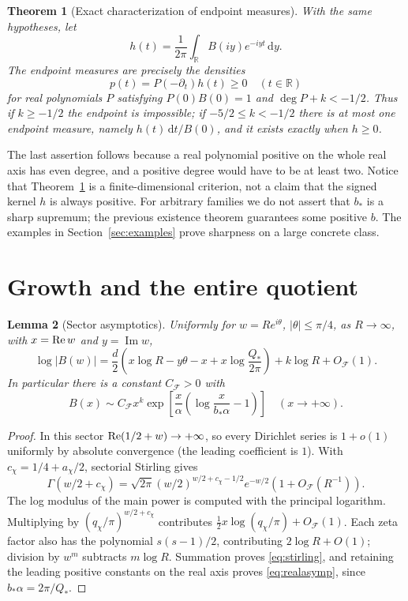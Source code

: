 \documentclass[11pt]{article}
\newtheorem{theorem}{Theorem}[section]
\newtheorem{lemma}[theorem]{Lemma}
\theoremstyle{remark}\newtheorem{remark}[theorem]{Remark}
\newcommand{\R}{\mathbb R}\newcommand{\C}{\mathbb C}
\newcommand{\F}{\mathcal F}\newcommand{\dd}{\,\mathrm d}
\newcommand{\Ima}{\operatorname{Im}}\newcommand{\sinc}{\operatorname{sinc}}
\begin{document}
\begin{theorem}[Exact characterization of endpoint measures]\label{thm:class}
With the same hypotheses, let
\[
 h(t)=\frac1{2\pi}\int_{\R}B(iy)e^{-iyt}\dd y.
\]
The endpoint measures are precisely the densities
\begin{equation}\label{eq:density}
 p(t)=P(-\partial_t)h(t)\ge0\quad(t\in\R)
\end{equation}
for real polynomials $P$ satisfying $P(0)B(0)=1$ and $\deg P+k<-1/2$. Thus if $k\ge-1/2$ the endpoint is impossible; if $-5/2\le k<-1/2$ there is at most one endpoint measure, namely $h(t)\dd t/B(0)$, and it exists exactly when $h\ge0$.
\end{theorem}

The last assertion follows because a real polynomial positive on the whole real axis has even degree, and a positive degree would have to be at least two. Notice that Theorem~\ref{thm:class} is a finite-dimensional criterion, not a claim that the signed kernel $h$ is always positive. For arbitrary families we do not assert that $b_*$ is a sharp supremum; the previous existence theorem guarantees some positive $b$. The examples in Section~\ref{sec:examples} prove sharpness on a large concrete class.

\section{Growth and the entire quotient}
\begin{lemma}[Sector asymptotics]\label{lem:stirling}
Uniformly for $w=R e^{i\theta}$, $|\theta|\le\pi/4$, as $R\to\infty$, with $x=\operatorname{Re} w$ and $y=\Ima w$,
\begin{equation}\label{eq:stirling}
 \log|B(w)|=\frac d2\left(x\log R-y\theta-x+x\log\frac{Q_*}{2\pi}\right)+k\log R+O_\F(1).
\end{equation}
In particular there is a constant $C_\F>0$ with
\begin{equation}\label{eq:realasymp}
 B(x)\sim C_\F x^k\exp\left[\frac x\alpha\left(\log\frac{x}{b_*\alpha}-1\right)\right]
 \quad(x\to+\infty).
\end{equation}
\end{lemma}
\begin{proof}
In this sector $\operatorname{Re}(1/2+w)\to+\infty$, so every Dirichlet series is $1+o(1)$ uniformly by absolute convergence (the leading coefficient is $1$). With $c_\chi=1/4+a_\chi/2$, sectorial Stirling gives
\[
 \Gamma(w/2+c_\chi)=\sqrt{2\pi}(w/2)^{w/2+c_\chi-1/2}e^{-w/2}(1+O_\F(R^{-1})).
\]
The log modulus of the main power is computed with the principal logarithm. Multiplying by $(q_\chi/\pi)^{w/2+c_\chi}$ contributes $\tfrac12x\log(q_\chi/\pi)+O_\F(1)$. Each zeta factor also has the polynomial $s(s-1)/2$, contributing $2\log R+O(1)$; division by $w^m$ subtracts $m\log R$. Summation proves \eqref{eq:stirling}, and retaining the leading positive constants on the real axis proves \eqref{eq:realasymp}, since $b_*\alpha=2\pi/Q_*$.
\end{proof}
\end{document}
